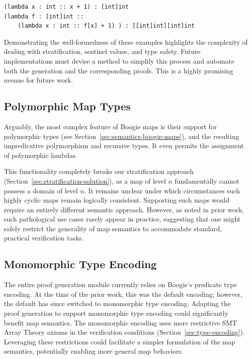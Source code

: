 \begin{lstlisting}[numbers=none]
(lambda x : int :: x + 1) : [int]int
(lambda f : [int]int :: 
    (lambda x : int :: f[x] + 1) ) : [[int]int][int]int
\end{lstlisting}

Demonstrating the well-formedness of these examples highlights the complexity of dealing with stratification, sentinel values, and type safety.
Future implementations must devise a method to simplify this process and automate both the generation and the corresponding proofs.
This is a highly promising avenue for future work.

\subsection{Polymorphic Map Types}

Arguably, the most complex feature of Boogie maps is their support for polymorphic types (see Section~\ref{sec:semantics-boogie-maps}),
and the resulting impredicative polymorphism and recursive types.
It even permits the assignment of polymorphic lambdas.

This functionality completely breaks our stratification approach (Section~\ref{sec:stratification-solution}),
as a map of level $n$ fundamentally cannot possess a domain of level $n$.
It remains unclear under which circumstances such highly cyclic maps remain logically consistent.
Supporting such maps would require an entirely different semantic approach.
However, as noted in prior work, such pathological use cases rarely appear in practice,
suggesting that one might safely restrict the generality of map semantics to accommodate standard, practical verification tasks.

\subsection{Monomorphic Type Encoding}

The entire proof generation module currently relies on Boogie's predicate type encoding.
At the time of the prior work, this was the default encoding;
however, the default has since switched to monomorphic type encoding.
Adapting the proof generation to support monomorphic type encoding could significantly benefit map semantics.
The monomorphic encoding uses more restrictive SMT Array Theory axioms in the verification conditions (Section~\ref{sec:type-encoding}).
Leveraging these restrictions could facilitate a simpler formulation of the map semantics, potentially enabling more general map behaviors.

